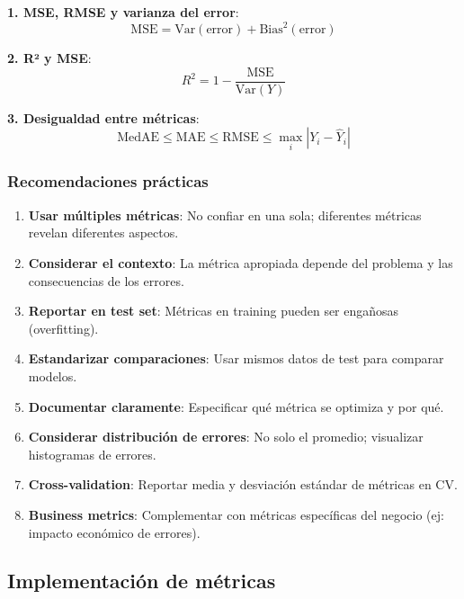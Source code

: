 \documentclass[
  doc,
  floatsintext,
  longtable,
  a4paper,
  nolmodern,
  notxfonts,
  notimes,
  12pt,
  colorlinks=true,linkcolor=blue,citecolor=blue,urlcolor=blue]{apa7}
\begin{document}
\textbf{1. MSE, RMSE y varianza del error}: \[
\text{MSE} = \text{Var}(\text{error}) + \text{Bias}^2(\text{error})
\]

\textbf{2. R² y MSE}: \[
R^2 = 1 - \frac{\text{MSE}}{\text{Var}(Y)}
\]

\textbf{3. Desigualdad entre métricas}: \[
\text{MedAE} \leq \text{MAE} \leq \text{RMSE} \leq \max_i |Y_i - \hat{Y}_i|
\]

\subsubsection{Recomendaciones
prácticas}\label{recomendaciones-pruxe1cticas-3}

\begin{enumerate}
\def\labelenumi{\arabic{enumi}.}
\item
  \textbf{Usar múltiples métricas}: No confiar en una sola; diferentes
  métricas revelan diferentes aspectos.
\item
  \textbf{Considerar el contexto}: La métrica apropiada depende del
  problema y las consecuencias de los errores.
\item
  \textbf{Reportar en test set}: Métricas en training pueden ser
  engañosas (overfitting).
\item
  \textbf{Estandarizar comparaciones}: Usar mismos datos de test para
  comparar modelos.
\item
  \textbf{Documentar claramente}: Especificar qué métrica se optimiza y
  por qué.
\item
  \textbf{Considerar distribución de errores}: No solo el promedio;
  visualizar histogramas de errores.
\item
  \textbf{Cross-validation}: Reportar media y desviación estándar de
  métricas en CV.
\item
  \textbf{Business metrics}: Complementar con métricas específicas del
  negocio (ej: impacto económico de errores).
\end{enumerate}

\subsection{Implementación de
métricas}\label{implementaciuxf3n-de-muxe9tricas}
\end{document}
